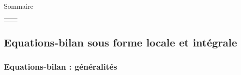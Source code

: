 

\begin{frame}{Sommaire}

\small
  
\hspace*{2mm}
\begin{tabular}{cc}
  		\begin{minipage}{62mm}
  			\tableofcontents[firstsection=-2]
      \vspace{15mm}
  		\end{minipage}
  		&   
  		\begin{minipage}{60cm}
		  \vspace*{-5mm}  
  		\end{minipage}
  	\end{tabular}

\vspace{0mm}

\end{frame}


\subsection{ Equations-bilan  sous forme locale et intégrale}

\subsubsection{Equations-bilan : généralités}

